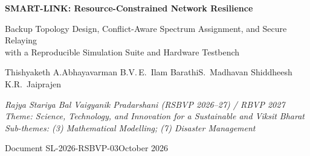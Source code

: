 \documentclass[10pt,a4paper]{article}
\begin{document}
\thispagestyle{firstpage}

\begin{center}
  {\LARGE\bfseries SMART-LINK: Resource-Constrained Network Resilience\par}
  \vspace{6pt}
  {\large Backup Topology Design, Conflict-Aware Spectrum Assignment, and Secure Relaying\\
   with a Reproducible Simulation Suite and Hardware Testbench\par}
  \vspace{12pt}
  {\normalsize Thishyaketh A.\qquad Abhayavarman B.\qquad V.\,E.\ Ilam Barathi\qquad S.\ Madhavan\qquad
   Shiddheesh K.\qquad R.\ Jaiprajen\par}
  \vspace{6pt}
  {\small\itshape Rajya Stariya Bal Vaigyanik Pradarshani (RSBVP 2026--27) / RBVP 2027\\
   Theme: Science, Technology, and Innovation for a Sustainable and Viksit Bharat\\
   Sub-themes: (3) Mathematical Modelling; (7) Disaster Management\par}
  \vspace{4pt}
  {\small Document SL-2026-RSBVP-03\enspace\textperiodcentered\enspace October 2026\par}
\end{center}
\vspace{4pt}
\end{document}
